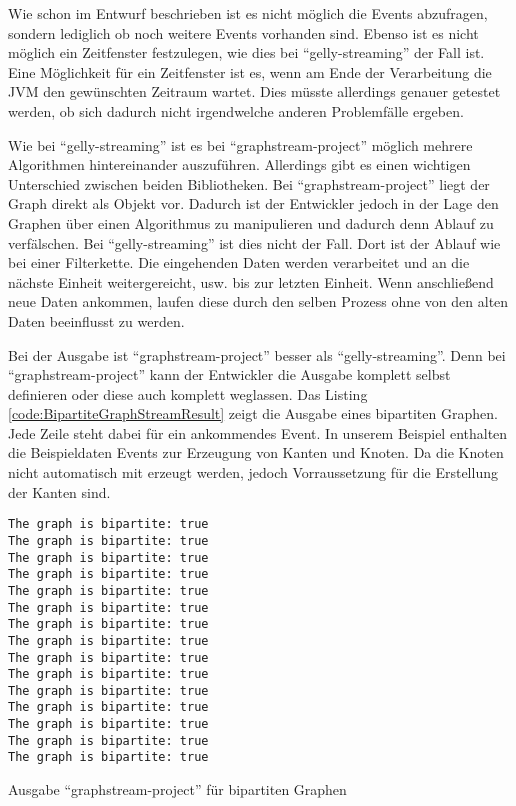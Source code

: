Wie schon im Entwurf beschrieben ist es nicht möglich die Events abzufragen,
sondern lediglich ob noch weitere Events vorhanden sind. Ebenso ist es nicht
möglich ein Zeitfenster festzulegen, wie dies bei \enquote{gelly-streaming}
der Fall ist. Eine Möglichkeit für ein Zeitfenster ist es, wenn am Ende der
Verarbeitung die \gls{JVM} den gewünschten Zeitraum wartet. Dies müsste
allerdings genauer getestet werden, ob sich dadurch nicht irgendwelche anderen
Problemfälle ergeben.

Wie bei \enquote{gelly-streaming} ist es bei \enquote{graphstream-project}
möglich mehrere Algorithmen hintereinander auszuführen. Allerdings gibt es einen
wichtigen Unterschied zwischen beiden Bibliotheken. Bei \enquote{graphstream-project}
liegt der Graph direkt als Objekt vor. Dadurch ist der Entwickler jedoch in
der Lage den Graphen über einen Algorithmus zu manipulieren und dadurch denn
Ablauf zu verfälschen. Bei \enquote{gelly-streaming} ist dies nicht der Fall.
Dort ist der Ablauf wie bei einer Filterkette. Die eingehenden Daten werden
verarbeitet und an die nächste Einheit weitergereicht, usw. bis zur letzten
Einheit. Wenn anschließend neue Daten ankommen, laufen diese durch den selben
Prozess ohne von den alten Daten beeinflusst zu werden.

Bei der Ausgabe ist \enquote{graphstream-project} besser als
\enquote{gelly-streaming}. Denn bei \enquote{graphstream-project} kann der
Entwickler die Ausgabe komplett selbst definieren oder diese auch komplett
weglassen. Das Listing \ref{code:BipartiteGraphStreamResult} zeigt die Ausgabe
eines bipartiten Graphen. Jede Zeile steht dabei für ein ankommendes Event. In
unserem Beispiel enthalten die Beispieldaten Events zur Erzeugung von Kanten und
Knoten. Da die Knoten nicht automatisch mit erzeugt werden, jedoch Vorraussetzung
für die Erstellung der Kanten sind.

\begin{listing}
\begin{verbatim}
The graph is bipartite: true
The graph is bipartite: true
The graph is bipartite: true
The graph is bipartite: true
The graph is bipartite: true
The graph is bipartite: true
The graph is bipartite: true
The graph is bipartite: true
The graph is bipartite: true
The graph is bipartite: true
The graph is bipartite: true
The graph is bipartite: true
The graph is bipartite: true
The graph is bipartite: true
The graph is bipartite: true
\end{verbatim}
\caption{Ausgabe \enquote{graphstream-project} für bipartiten Graphen}
\label{code:BipartiteGraphStreamResult}
\end{listing}

